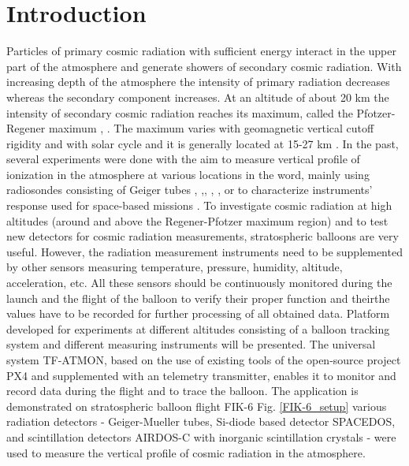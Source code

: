 \documentclass{Rpd}
\begin{document}
\section{Introduction}

Particles of primary cosmic radiation with sufficient energy interact in the upper part of the atmosphere and generate showers of secondary cosmic radiation. With increasing depth of the atmosphere the intensity of primary radiation decreases whereas the secondary component increases. At an altitude of about 20 km the intensity of secondary cosmic radiation reaches its maximum, called the Pfotzer-Regener maximum \cite{Regener}, \cite{Pfotzer}. The maximum varies with geomagnetic vertical cutoff rigidity and with solar cycle and it is generally located at 15-27 km \cite{Bazilevskaya}.
In the past, several experiments were done with the aim to measure vertical profile of ionization in the atmosphere at various locations in the word, mainly using radiosondes consisting of Geiger tubes \cite{Bazilevskaya}, \cite{ionization_profile},\cite{Vertical_profile_measurements}, \cite{cosmic_ray_intensity}, \cite{Radioactivity_atmosphere}, or to characterize instruments’ response used for space-based missions \cite{Lawrence} \cite{Mukherjee} \cite{Timepix}.
To investigate cosmic radiation at high altitudes (around and above the Regener-Pfotzer maximum region) and to test new detectors for cosmic radiation measurements, stratospheric balloons are very useful.
However, the radiation measurement instruments need to be supplemented by other sensors measuring temperature, pressure, humidity, altitude, acceleration, etc.  All these sensors should be continuously monitored during the launch and the flight of the balloon to verify their proper function and theirthe values have to be recorded for further processing of all obtained data.
Platform developed for experiments at different altitudes consisting of a balloon tracking system and different measuring instruments will be presented. The universal system TF-ATMON, based on the use of existing tools of the open-source project PX4 and supplemented with an telemetry transmitter, enables it to monitor and record data during the flight and to trace the balloon. The application is demonstrated on stratospheric balloon flight FIK-6 Fig. \ref{FIK-6_setup} various radiation detectors - Geiger-Mueller tubes, Si-diode based detector SPACEDOS, and scintillation detectors AIRDOS-C with inorganic scintillation crystals - were used to measure the vertical profile of cosmic radiation in the atmosphere.
\end{document}
